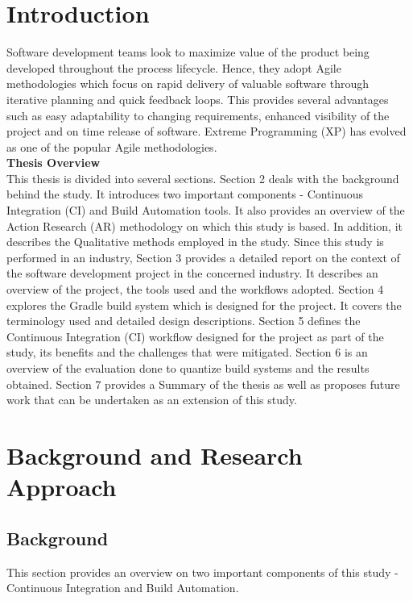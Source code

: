 \documentclass[12pt, a4paper, titlepage]{scrartcl}
\begin{document}
\pagebreak
\tableofcontents 
\pagebreak
\listoffigures
\newpage

\section{Introduction}
\par Software development teams look to maximize value of the product being developed throughout the process lifecycle. Hence, they adopt Agile methodologies which focus on rapid delivery of valuable software through iterative planning and quick feedback loops. This provides several advantages such as easy adaptability to changing requirements, enhanced visibility of the project and on time release of software. Extreme Programming (XP) has evolved as one of the popular Agile methodologies. 
\\
\textbf{Thesis Overview} \\
This thesis is divided into several sections. Section 2 deals with the background behind the study. It introduces two important components - Continuous Integration (CI) and Build Automation tools. It also provides an overview of the Action Research (AR) methodology on which this study is based. In addition, it describes the Qualitative methods employed in the study. Since this study is performed in an industry, Section 3 provides a detailed report on the context of the software development project in the concerned industry. It describes an overview of the project, the tools used and the workflows adopted. Section 4 explores the Gradle build system which is designed for the project. It covers the terminology used and detailed design descriptions. Section 5 defines the Continuous Integration (CI) workflow designed for the project as part of the study, its benefits and the challenges that were mitigated. Section 6 is an overview of the evaluation done to quantize build systems and the results obtained. Section 7 provides a Summary of the thesis as well as proposes future work that can be undertaken as an extension of this study. 
\pagebreak
\section{Background and Research Approach}

\subsection{Background}
This section provides an overview on two important components of this study - Continuous Integration and Build Automation. 
\end{document}
